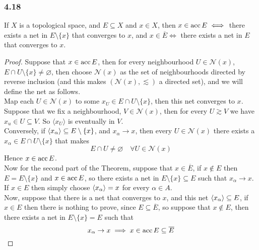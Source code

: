 \documentclass[../../main.tex]{subfiles}
\begin{document}
\subsubsection*{4.18}
\begin{wts}
If $X$ is a topological space, and $E\subseteq X$ and $x\in X$, then $x\in\operatorname{acc}{E}\iff$ there exists a net in $E\setminus\{x\}$ that converges to $x$, and $x\in \overline{E}\iff$ there exists a net in $E$ that converges to $x$.
\end{wts}
\newcommand{\nx}{\mathcal{N}(x)} %
\begin{proof}
Suppose that $x\in\operatorname{acc}{E}$, then for every neighbourhood $U\in\mathcal{N}(x)$, $E\cap U\setminus\{x\}\neq\varnothing$, then choose $\mathcal{N}(x)$ as the set of neighbourhoods directed by reverse inclusion (and this makes $(\mathcal{N}(x),\lesssim)$ a directed set), and we will define the net as follows.\\

Map each $U\in \mathcal{N}(x)$ to some $x_U\in E\cap U\setminus\{x\}$, then this net converges to $x$. Suppose that we fix a neighbourhood, $V\in\nx$, then for every $U\gtrsim V$ we have $x_u\in U\subseteq V$. So $\langle x_U \rangle$ is eventually in $V$.\\

Conversely, if $\langle {x_\alpha} \rangle\subseteq E\setminus\{x\}$, and $x_\alpha\to x$, then every $U\in\nx$ there exists a $x_\alpha\in E\cap U\setminus\{x\}$ that makes
\[
E\cap U\neq \varnothing\quad \forall U\in\nx
\]
Hence $x\in\operatorname{acc}{E}$.\\

Now for the second part of the Theorem, suppose that $x\in\overline{E}$, if $x\notin E$ then $E = E\setminus\{x\}$ and $x\in\operatorname{acc}{E}$, so there exists a net in $E\setminus\{x\}\subseteq E$ such that $x_\alpha\to x$. If $x\in E$ then simply choose $\langle {x_\alpha} \rangle=x$ for every $\alpha\in A$.\\

Now, suppose that there is a net that converges to $x$, and this net $\langle {x_\alpha} \rangle\subseteq E$, if $x\in E$ then there is nothing to prove, since $E\subseteq\overline{E}$, so suppose that $x\notin E$, then there exists a net in $E\setminus\{x\}=E$ such that 
\[
x_\alpha\to x\implies x\in\operatorname{acc}{E}\subseteq\overline{E}
\]
\end{proof}
\end{document}
